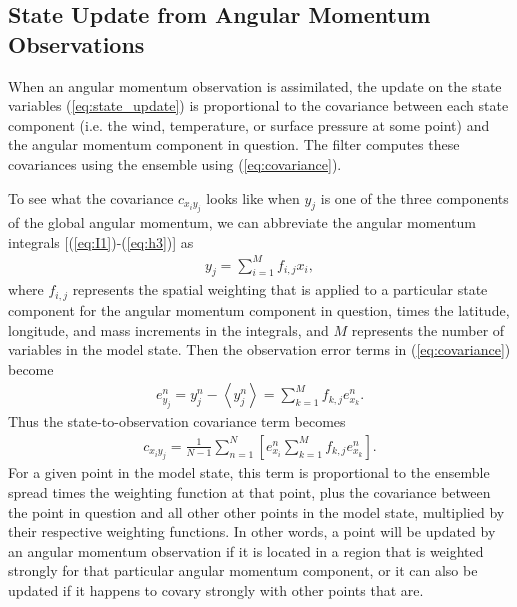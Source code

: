 \subsection{State Update from Angular Momentum Observations}
\label{sec:erpda}

When an angular momentum observation is assimilated, the update on the state variables (\ref{eq:state_update}) is proportional to the covariance between each state component (i.e. the wind, temperature, or surface pressure at some point) and the angular momentum component in question. 
The filter computes these covariances using the ensemble using (\ref{eq:covariance}).


To see what the covariance $c_{x_i y_j}$ looks like when $y_j$ is one of the three components of the global angular momentum, we can abbreviate the angular momentum integrals [(\ref{eq:I1})-(\ref{eq:h3})] as
%
\begin{eqnarray}
y_j = \sum_{i=1}^M f_{i,j} x_i,
\end{eqnarray}
%
where $f_{i,j}$ represents the spatial weighting that is applied to a particular state component for the angular momentum component in question, times the latitude, longitude, and mass increments in the integrals, and $M$ represents the number of variables in the model state.
Then the observation error terms in (\ref{eq:covariance}) become
\begin{eqnarray}
	e_{y_j}^n = y_j^n - \left< y_j^n \right>
	= \sum_{k=1}^{M}f_{k,j}e_{x_k}^n.
\end{eqnarray}
Thus the state-to-observation covariance term becomes
\begin{eqnarray}
	c_{x_i y_j} = \frac{1}{N-1}
	\sum_{n=1}^{N}
	\left[
	e_{x_i}^n
	\sum_{k=1}^{M} f_{k,j}e_{x_k}^n
	\right].
	\label{eq:state_to_obs_covariance}
\end{eqnarray}
For a given point in the model state, this term is proportional to the ensemble spread times the weighting function at that point, plus the covariance between the point in question and all other other points in the model state, multiplied by their respective weighting functions. 
In other words, a point will be updated by an angular momentum observation if it is located in a region that is weighted strongly for that particular angular momentum component, or it can also be updated if it happens to covary strongly with other points that are.

